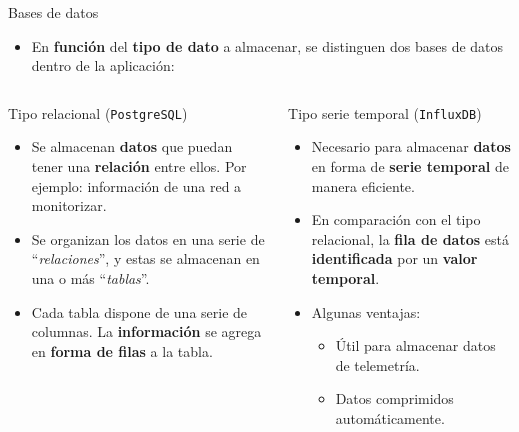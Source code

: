 \documentclass[aspectratio=169,xcolor=dvipsnames]{beamer}
\begin{document}
	
	\begin{frame}{Bases de datos}
		
		\begin{itemize}
			\item En \textbf{función} del \textbf{tipo de dato} a almacenar, se distinguen dos bases de datos dentro de la aplicación:
		\end{itemize}
		
		\begin{columns}
			\begin{column}{0.5\textwidth}
				\begin{block}{Tipo relacional (\texttt{PostgreSQL})}
					\begin{itemize}
						\item Se almacenan \textbf{datos} que puedan tener una \textbf{relación} entre ellos. Por ejemplo: información de una red a monitorizar.
						
						\item Se organizan los datos en una serie de ``\textit{relaciones}'', y estas se almacenan en una o más ``\textit{tablas}''.
						
						\item Cada tabla dispone de una serie de columnas. La \textbf{información} se agrega en \textbf{forma de filas} a la tabla.
					\end{itemize}
				\end{block}
			\end{column}
			
			
			\begin{column}{0.5\textwidth}
				\begin{block}{Tipo serie temporal (\texttt{InfluxDB})}
					\begin{itemize}
						\item Necesario para almacenar \textbf{datos} en forma de \textbf{serie temporal} de manera eficiente.
						
						\item En comparación con el tipo relacional, la \textbf{fila de datos} está \textbf{identificada} por un \textbf{valor temporal}.
						
						\item Algunas ventajas:
						\begin{itemize}
							\item Útil para almacenar datos de telemetría.
							\item Datos comprimidos automáticamente.
						\end{itemize}
					\end{itemize}
				\end{block}
			\end{column}
		\end{columns}
	\end{frame}
	
\end{document}
